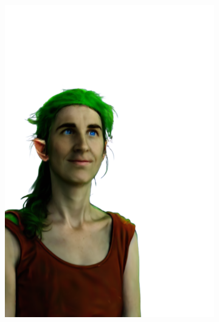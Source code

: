 \begin{figure}[ht]
\begin{subfigure}{0.08\linewidth}
        \includegraphics[width=\textwidth]{Figures/results/high/dora_elf/11_render.png}

\end{subfigure}
\end{figure}
